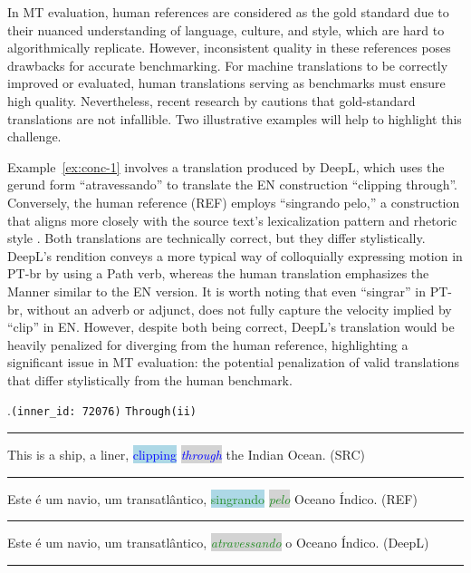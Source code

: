 In MT evaluation, human references are considered as the gold standard due to their nuanced understanding of language, culture, and style, which are hard to algorithmically replicate. However, inconsistent quality in these references poses drawbacks for accurate benchmarking. For machine translations to be correctly improved or evaluated, human translations serving as benchmarks must ensure high quality. Nevertheless, recent research by \textcite{xu2024contrastive} cautions that gold-standard translations are not infallible. Two illustrative examples will help to highlight this challenge.

Example~\ref{ex:conc-1} involves a translation produced by DeepL, which uses the gerund form ``atravessando'' to translate the EN construction ``clipping through''. Conversely, the human reference (REF) employs ``singrando pelo,'' a construction that aligns more closely with the source text's lexicalization pattern and rhetoric style \parencite{talmy2000toward,talmy2000towardb, slobin2005relating}. Both translations are technically correct, but they differ stylistically. DeepL's rendition conveys a more typical way of colloquially expressing motion in PT-br by using a Path verb, whereas the human translation emphasizes the Manner similar to the EN version. It is worth noting that even ``singrar'' in PT-br, without an adverb or adjunct, does not fully capture the velocity implied by ``clip'' in EN. However, despite both being correct, DeepL's translation would be heavily penalized for diverging from the human reference, highlighting a significant issue in MT evaluation: the potential penalization of valid translations that differ stylistically from the human benchmark.

\ex.\texttt{(inner\_id: 72076)} \hfill  \texttt{Through(ii)} \\[0.3ex]
\noindent\rule{\linewidth}{0.9pt}
This is a ship, a liner, \colorbox{lightblue}{\textcolor{blue}{clipping}} \colorbox{lightgray}{\textcolor{blue}{\emph{through}}} the Indian Ocean. (SRC) \label{ex:conc-1} \\[-0.3ex]
\noindent\rule{\linewidth}{0.3pt}
Este é um navio, um transatlântico, \colorbox{lightblue}{\textcolor{ForestGreen}{singrando}} \colorbox{lightgray}{\textcolor{ForestGreen}{\emph{pelo}}} Oceano Índico. (REF) \\[-0.3ex]
\noindent\rule{\linewidth}{0.3pt}
Este é um navio, um transatlântico, \colorbox{lightgray}{\textcolor{ForestGreen}{\emph{atravessando}}} o Oceano Índico. (DeepL)
\noindent\rule{\linewidth}{0.9pt}

